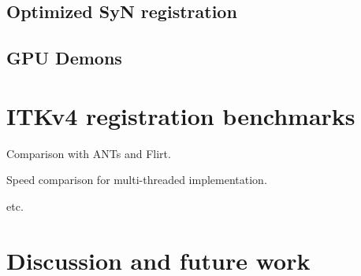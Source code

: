 \documentclass{article}
\begin{document}
\subsection{Optimized SyN registration}

\subsection{GPU Demons}

\section{ITKv4 registration benchmarks}

Comparison with ANTs and Flirt.  

Speed comparison for multi-threaded implementation.

etc.
\section{Discussion and future work}
\end{document}
